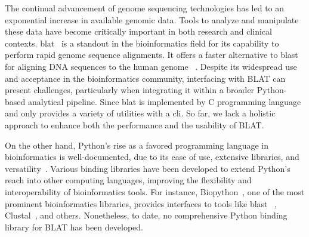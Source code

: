 

The continual advancement of genome sequencing technologies has led to an exponential increase in available genomic data.
Tools to analyze and manipulate these data have become critically important in both research and clinical contexts.
\acrfull{blat}~\citep{kent2002blat} is a standout in the bioinformatics field for its capability to perform rapid genome sequence alignments.
It offers a faster alternative to \acrfull{blast}~\citep{altschul1990basic}  for aligning DNA sequences to the human genome ~\citep{kent2002blat}.
Despite its widespread use and acceptance in the bioinformatics community, interfacing with BLAT can present challenges, particularly when integrating it within a broader Python-based analytical pipeline.
Since \acrshort{blat} is implemented by C programming language and only provides a variety of utilities with a \acrfull{cli}.
So far, we lack a holistic approach to enhance both the performance and the usability of BLAT.

On the other hand, Python's rise as a favored programming language in bioinformatics is well-documented, due to its ease of use, extensive libraries, and versatility~\citep{perkel2015programming}.
Various binding libraries have been developed to extend Python's reach into other computing languages, improving the flexibility and interoperability of bioinformatics tools.
For instance, Biopython~\citep{cock2009biopython}, one of the most prominent bioinformatics libraries, provides interfaces to tools like \acrshort{blast} ~\citep{altschul1990basic}, Clustal~\citep{higgins1988clustal}, and others.
Nonetheless, to date, no comprehensive Python binding library for BLAT has been developed.

